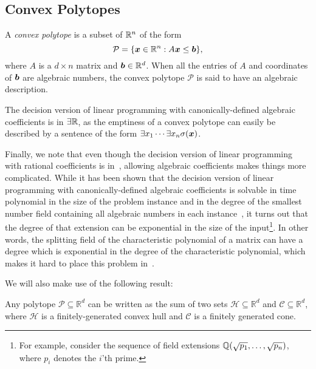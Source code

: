 \subsection{Convex Polytopes}

A \emph{convex polytope} is a subset of $\mathbb{R}^{n}$ of the form
\begin{equation*}
\mathcal{P} = \lbrace \boldsymbol{x} \in \mathbb{R}^{n} : A \boldsymbol{x} \leq \boldsymbol{b} \rbrace ,
\end{equation*}
where $A$ is a $d \times n$ matrix and $\boldsymbol{b} \in \mathbb{R}^{d}$. When all the entries of $A$ and coordinates of $\boldsymbol{b}$ are algebraic numbers, the convex polytope $\mathcal{P}$ is said to have an algebraic description.

The decision version of linear programming with canonically-defined algebraic coefficients is in $\exists\mathbb{R}$, as the emptiness of a convex polytope can easily be described by a sentence of the form $\exists x_1 \cdots \exists x_n \sigma(\boldsymbol{x})$.

Finally, we note that even though the decision version of linear
programming with rational coefficients is in~\PTIME{}, allowing
algebraic coefficients makes things more complicated. While it has
been shown that the decision version of linear programming
with canonically-defined algebraic coefficients is solvable in time polynomial
in the size of the problem instance and in the degree of the smallest
number field containing all algebraic numbers in each instance~\cite{AdlerB94}, it
turns out that the degree of that extension can
be exponential in the size of the input\footnote{For example, consider the sequence of field extensions $\mathbb{Q}(\sqrt{p_{1}}, \ldots, \sqrt{p_{n}})$, where $p_{i}$ denotes the $i$'th prime.}. In other words, the splitting
field of the characteristic polynomial of a matrix can have a degree
which is exponential in the degree of the characteristic polynomial, which makes it hard to place this problem in~\PTIME{}.

We will also make use of the following result:
\begin{theorem}
  Any polytope $\mathcal{P} \subseteq \mathbb{R}^{d}$ can be written as the sum of two sets $\mathcal{H} \subseteq \mathbb{R}^{d}$ and $\mathcal{C} \subseteq \mathbb{R}^{d}$, where $\mathcal{H}$ is a finitely-generated convex hull and $\mathcal{C}$ is a finitely generated cone.
\end{theorem}
